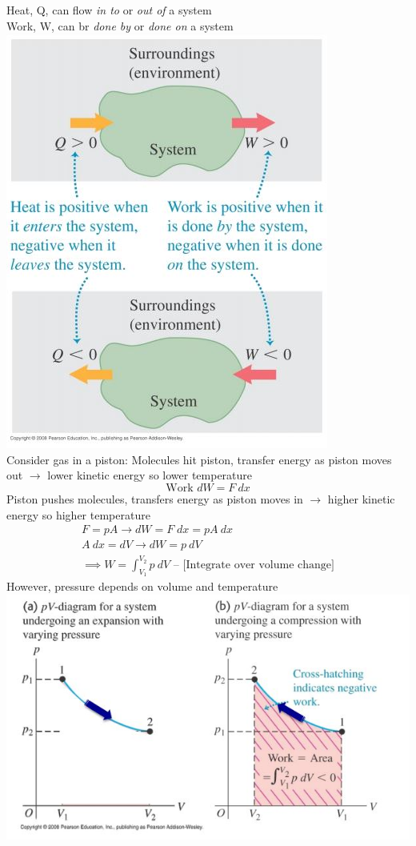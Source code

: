 \documentclass[a4paper, 11pt, normalem]{report}
\begin{document}
Heat, Q, can flow \emph{in to} or \emph{out of} a system \\
Work, W, can br \emph{done by} or \emph{done on} a system \\
\includegraphics{ThermoSystem.jpg} \\
Consider gas in a piston:
Molecules hit piston, transfer energy as piston moves out $\rightarrow$ lower kinetic energy so lower temperature
\begin{equation*}
	\text{Work } dW = F\:dx
\end{equation*}
Piston pushes molecules, transfers energy as piston moves in $\rightarrow$ higher kinetic energy so higher temperature
\begin{gather*}
	F = pA \rightarrow dW = F\;dx = pA\:dx \\
	A\:dx = dV \rightarrow dW = p\:dV \\
	\implies W = \int_{V_{1}}^{V_{2}} p\:dV \text{ -- [Integrate over volume change]}
\end{gather*}
However, pressure depends on volume and temperature \\
\includegraphics[scale=0.8]{pV.jpg} \\
\end{document}
